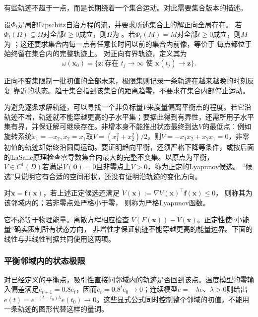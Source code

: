 有些轨迹不趋于一点，而是长期绕着一个集合运动。对此需要集合版本的描述。
\begin{definition}[不变集合与轨迹极限集]
  \label{def:dynamical-invariant-limit-sets}
  设$\Phi_t$是局部Lipschitz自治方程的流，并要求所述集合上的解正向全局存在。
  若$\Phi_t(\Omega)\subseteq\Omega$对全部$t\geq0$成立，则$\Omega$为
  。若$\Phi_t(M)=M$对全部$t\geq0$成立，则$M$为
  ；这还要求集合内每一点有任意长时间以前的集合内前像，等价于
  每点都位于始终留在集合内的完整轨迹上。
  对正向有界轨迹，定义其为
  \[
    \omega(\bm x_0)=
    \{\bm z:\text{存在 }t_j\to\infty\text{ 使 }\bm x(t_j)\to\bm z\}.
  \]
\end{definition}
正向不变集限制一批初值的全部未来，极限集则记录一条轨迹在越来越晚的时刻反复
靠近的状态。趋于集合指到该集合的距离趋零，不要求在集合内部停止运动。

为避免逐条求解轨迹，可以寻找一个非负标量\(V\)来度量偏离平衡点的程度。若它沿轨迹不增，轨迹就不能穿越更高的子水平集；要据此得到有界性，还需所用子水平集有界，并保证解可继续存在。非增本身不能推出状态最终到达\(V\)的最低点：例如旋转系统\(\dot x_1=-x_2,\dot x_2=x_1\)取\(V=(x_1^2+x_2^2)/2\)，则\(\dot V=-x_1x_2+x_2x_1=0\)，非零初值的轨迹却始终沿圆周运动。要证明趋向平衡，还须严格下降等条件，或按后面的LaSalle原理检查零导数集合内最大的完整不变集。以原点为平衡，
$V\in C^1(D)$若满足$V(\bm0)=0$且非零点上$V>0$，称为正定的Lyapunov候选。
“候选”只说明它有合适的空间形状，还没有证明沿轨迹的变化方向。
\begin{definition}[Lyapunov函数]
  \label{def:dynamical-lyapunov-function}
  对$\dot{\bm x}=\bm f(\bm x)$，若上述正定候选还满足
  $\dot V(\bm x):=\nabla V(\bm x)^\top\bm f(\bm x)\leq0$，
  则称其为该邻域内的；若非零点处严格小于零，
  则称为严格Lyapunov函数。
\end{definition}
它不必等于物理能量。离散方程相应检查
$V(F(\bm x))-V(\bm x)$。正定性使“小能量”确实限制所有状态方向，
非增性才保证轨迹不能穿越更高的能量边界。下面的线性与非线性判据共同使用这两项。

\subsubsection{平衡邻域内的状态极限}
对已经定义的平衡点，吸引性直接问邻域内的轨迹是否回到该点。温度模型的零输入偏差满足\(e_{t+1}=0.8e_t\)，因而\(e_t=0.8^t e_0\to0\)；连续模型\(\dot e=-\lambda e\)、\(\lambda>0\)则给出\(e(t)=e^{-(t-t_0)\lambda}e(t_0)\to0\)。这些显式公式同时控制整个邻域的初值，不能用一条轨迹的图形代替这样的量词。

